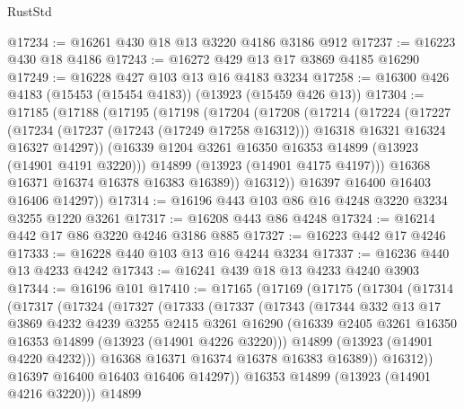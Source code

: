 \begin{lexlean}{RustStd}
\begin{coremodule}
@17234 := @16261 @430 @18 @13 @3220 @4186 @3186 @912
@17237 := @16223 @430 @18 @4186
@17243 := @16272 @429 @13 @17 @3869 @4185 @16290
@17249 := @16228 @427 @103 @13 @16 @4183 @3234
@17258 := @16300 @426 @4183 (@15453 (@15454 @4183)) (@13923 (@15459 @426 @13))
@17304 := @17185
    (@17188
      (@17195
        (@17198
          (@17204
            (@17208
              (@17214
                (@17224
                  (@17227
                    (@17234
                      (@17237 (@17243 (@17249 @17258 @16312)))
                      @16318
                      @16321
                      @16324
                      @16327
                      @14297))
                  (@16339 @1204 @3261 @16350 @16353 @14899 (@13923 (@14901 @4191 @3220)))
                  @14899
                  (@13923 (@14901 @4175 @4197)))
                @16368
                @16371
                @16374
                @16378
                @16383
                @16389))
            @16312))
        @16397
        @16400
        @16403
        @16406
        @14297))
@17314 := @16196 @443 @103 @86 @16 @4248 @3220 @3234 @3255 @1220 @3261
@17317 := @16208 @443 @86 @4248
@17324 := @16214 @442 @17 @86 @3220 @4246 @3186 @885
@17327 := @16223 @442 @17 @4246
@17333 := @16228 @440 @103 @13 @16 @4244 @3234
@17337 := @16236 @440 @13 @4233 @4242
@17343 := @16241 @439 @18 @13 @4233 @4240 @3903
@17344 := @16196 @101
@17410 := @17165
    (@17169
      (@17175
        (@17304
          (@17314
            (@17317
              (@17324
                (@17327
                  (@17333
                    (@17337
                      (@17343
                        (@17344
                          @332
                          @13
                          @17
                          @3869
                          @4232
                          @4239
                          @3255
                          @2415
                          @3261
                          @16290
                          (@16339 @2405 @3261 @16350 @16353 @14899 (@13923 (@14901 @4226 @3220)))
                          @14899
                          (@13923 (@14901 @4220 @4232)))
                        @16368
                        @16371
                        @16374
                        @16378
                        @16383
                        @16389))
                    @16312))
                @16397
                @16400
                @16403
                @16406
                @14297))
            @16353
            @14899
            (@13923 (@14901 @4216 @3220)))
          @14899

\end{coremodule}
\end{lexlean}
